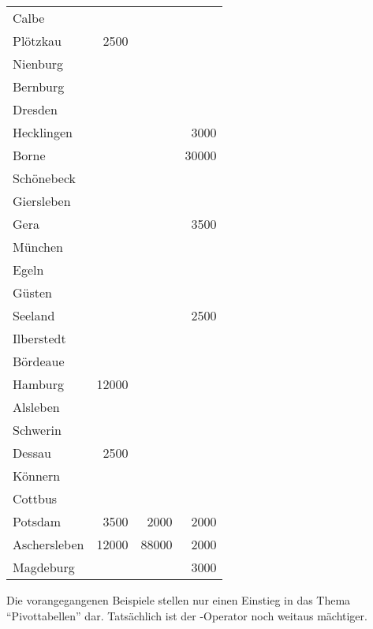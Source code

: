 \begin{center}
    \begin{small}
        \tablehead{}
        \begin{oraclesql}
            \begin{supertabular}{lrrr}
                Calbe &  &  &  \\
                Plötzkau & 2500 &  &  \\
                Nienburg &  &  &  \\
                Bernburg &  &  &  \\
                Dresden &  &  &  \\
                Hecklingen &  &  & 3000 \\
                Borne &  &  & 30000 \\
                Schönebeck &  &  &  \\
                Giersleben &  &  &  \\
                Gera &  &  & 3500 \\
                München &  &  &  \\
                Egeln &  &  &  \\
                Güsten &  &  &  \\
                Seeland &  &  & 2500 \\
                Ilberstedt &  &  &  \\
                Bördeaue &  &  &  \\
                Hamburg & 12000 &  &  \\
                Alsleben &  &  &  \\
                Schwerin &  &  &  \\
                Dessau & 2500 &  &  \\
                Könnern &  &  &  \\
                Cottbus &  &  &  \\
                Potsdam & 3500 & 2000 & 2000 \\
                Aschersleben & 12000 & 88000 & 2000 \\
                Magdeburg &  &  & 3000 \\
            \end{supertabular}
        \end{oraclesql}
    \end{small}
\end{center}
Die vorangegangenen Beispiele stellen nur einen Einstieg in das Thema \enquote{Pivottabellen} dar. Tatsächlich ist der -Operator noch weitaus mächtiger.
